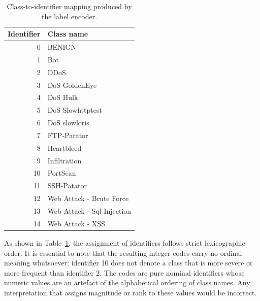 \documentclass[12pt,a4paper]{article}
\begin{document}
\begin{table}[H]
    \centering
    \caption{Class-to-identifier mapping produced by the label encoder.}
    \label{tab:label_encoding}
    \begin{tabular}{|r|l|}
        \hline
        \textbf{Identifier} & \textbf{Class name}        \\
        \hline
        0                   & BENIGN                     \\
        \hline
        1                   & Bot                        \\
        \hline
        2                   & DDoS                       \\
        \hline
        3                   & DoS GoldenEye              \\
        \hline
        4                   & DoS Hulk                   \\
        \hline
        5                   & DoS Slowhttptest           \\
        \hline
        6                   & DoS slowloris              \\
        \hline
        7                   & FTP-Patator                \\
        \hline
        8                   & Heartbleed                 \\
        \hline
        9                   & Infiltration               \\
        \hline
        10                  & PortScan                   \\
        \hline
        11                  & SSH-Patator                \\
        \hline
        12                  & Web Attack - Brute Force   \\
        \hline
        13                  & Web Attack - Sql Injection \\
        \hline
        14                  & Web Attack - XSS           \\
        \hline
    \end{tabular}
\end{table}

As shown in Table~\ref{tab:label_encoding}, the assignment of identifiers follows
strict lexicographic order. It is essential to note that the resulting integer codes
carry no ordinal meaning whatsoever: identifier 10 does not denote a class that is
more severe or more frequent than identifier 2. The codes are pure nominal identifiers
whose numeric values are an artefact of the alphabetical ordering of class names.
Any interpretation that assigns magnitude or rank to these values would be incorrect.
\end{document}
